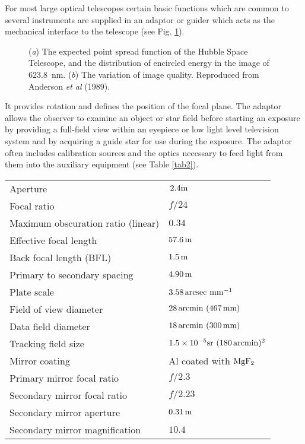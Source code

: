 For most large optical telescopes certain basic functions which
are common to several instruments are supplied in an adaptor or guider
which acts as the mechanical interface to the telescope (see Fig. \ref{fig2}).
\begin{figure}
 \vspace{250pt}
 \caption{({\it a\/}) The expected point spread function of the Hubble Space
              Telescope, and the distribution of encircled energy in
              the image of \mbox{623.8 nm.}
 ({\it b\/}) The variation of image quality. Reproduced from Anderson {\it et al\/} (1989).}
 \label{fig2}
\end{figure}
It provides rotation and defines the position of the focal plane. The
adaptor allows the observer to examine an object or star field before
starting an exposure by providing a full-field view within an eyepiece
or low light level television system and by acquiring a guide star for
use during the exposure. The adaptor often includes calibration sources
and the optics necessary to feed light from them into the auxiliary
equipment (see Table \ref{tab2}).
\begin{table*}
 \caption{Characteristics of the Hubble Space Telescope}
 \label{tab2}
\begin{tabular}{@{\hspace{1.75pc}}ll} %
\hline
\hline
Aperture                             & $\rm \, 2.4 m $ \\
Focal ratio                          & $ f/24 $ \\
Maximum obscuration ratio (linear)   & $ 0.34 $ \\
Effective focal length               & $ \rm 57.6\, m $ \\
Back focal length (BFL)              & $ \rm 1.5 \, m $ \\
Primary to secondary spacing         & $ \rm 4.90\, m $ \\
Plate scale                          & $ \rm 3.58\, arcsec\ mm^{-1}$ \\
Field of view diameter               & $ \rm 28\, arcmin\ (467\, mm)$ \\
Data field diameter                  & $ \rm 18\, arcmin\ (300\, mm)$ \\
Tracking field size                  & $ \rm 1.5 \times 10^{-5} sr
                                          \  (180\, arcmin)^2$\\
Mirror coating                       & Al coated with $ \rm MgF_2$\\
Primary mirror focal ratio           & $ f/2.3 $\\
Secondary mirror focal ratio         & $ f/2.23 $ \\
Secondary mirror aperture            & $ \rm 0.31\, m $\\
Secondary mirror magnification       & $ 10.4 $\\
\hline
\hline
\end{tabular}
\end{table*}

